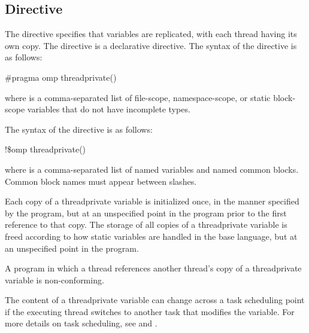 {{{{\subsection{ Directive}
\label{subsec:threadprivate Directive}
\summary
The  directive specifies that variables are replicated, with each thread 
having its own copy. The  directive is a declarative directive.
\syntax
\ccppspecificstart
The syntax of the  directive is as follows:

\begin{boxedcode}
\#pragma omp threadprivate() 
\end{boxedcode}

where  is a comma-separated list of file-scope, namespace-scope, or static 
block-scope variables that do not have incomplete types.
\ccppspecificend

\begin{samepage}

\fortranspecificstart
The syntax of the  directive is as follows:

\begin{boxedcode}
!\$omp threadprivate()
\end{boxedcode}

where  is a comma-separated list of named variables and named common blocks. 
Common block names must appear between slashes.
\fortranspecificend

\descr
Each copy of a threadprivate variable is initialized once, in the manner specified by the 
program, but at an unspecified point in the program prior to the first reference to that 
copy. The storage of all copies of a threadprivate variable is freed according to how 
static variables are handled in the base language, but at an unspecified point in the 
program.

A program in which a thread references another thread’s copy of a threadprivate variable 
is non-conforming.
\end{samepage}

The content of a threadprivate variable can change across a task scheduling point if the 
executing thread switches to another task that modifies the variable. For more details on 
task scheduling, see 
 and 
.

}}}}
